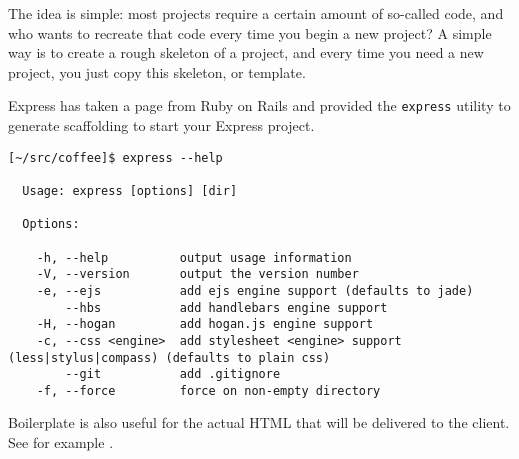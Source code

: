 The idea is simple: most projects
require a certain amount of so-called  code, and who
wants to recreate that code every time you begin a new project? A simple
way is to create a rough skeleton of a project, and every time you need
a new project, you just copy this skeleton, or template.

Express has taken a page from Ruby on Rails and provided the \verb|express|
utility  to
generate scaffolding to start your Express project.

\begin{verbatim}
[~/src/coffee]$ express --help

  Usage: express [options] [dir]

  Options:

    -h, --help          output usage information
    -V, --version       output the version number
    -e, --ejs           add ejs engine support (defaults to jade)
        --hbs           add handlebars engine support
    -H, --hogan         add hogan.js engine support
    -c, --css <engine>  add stylesheet <engine> support (less|stylus|compass) (defaults to plain css)
        --git           add .gitignore
    -f, --force         force on non-empty directory
\end{verbatim}

Boilerplate is also useful for the actual HTML that will be delivered to the client. See 
for example  
.


